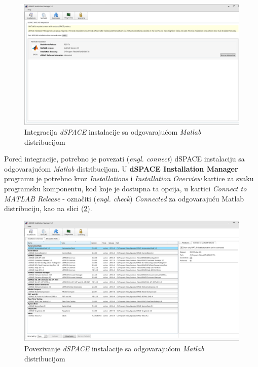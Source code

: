 \begin{figure}[h]
\begin{center}
\includegraphics[width=\textwidth]{slike/dSpace/matlab-integrate.png}
\end{center}
\caption{Integracija \textit{dSPACE} instalacije sa odgovarajućom \textit{Matlab} distribucijom}
\label{fig:matlab-integrate}
\end{figure}

Pored integracije, potrebno je povezati (\textit{engl. connect}) dSPACE instalaciju sa odgovarajućom \textit{Matlab} distribucijom. U \textbf{dSPACE Installation Manager} programu je potrebno kroz \textit{Installations} i \textit{Installation Overview} kartice za svaku programsku komponentu, kod koje je dostupna ta opcija, u kartici \textit{Connect to MATLAB Release} - označiti (\textit{engl. check}) \textit{Connected} za odgovarajuću Matlab distribuciju, kao na slici (\ref{fig:matlab-connect}).

\begin{figure}[h]
\begin{center}
\includegraphics[width=\textwidth]{slike/dSpace/matlab-connect.png}
\end{center}
\caption{Povezivanje \textit{dSPACE} instalacije sa odgovarajućom \textit{Matlab} distribucijom}
\label{fig:matlab-connect}
\end{figure}

